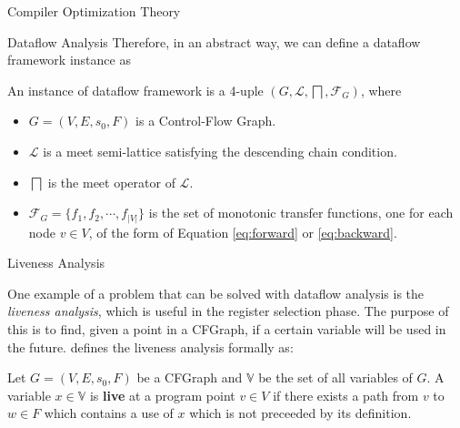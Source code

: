 \begin{section}{Compiler Optimization Theory}
\begin{subsection}{Dataflow Analysis}
	Therefore, in an abstract way, we can define a dataflow framework instance as
	\begin{definition}
		An instance of dataflow framework is a 4-uple $(G, \mathcal{L}, \bigsqcap, \mathcal{F}_G)$,
		where
		\begin{itemize}
			\item $G = (V, E, s_0, F)$ is a Control-Flow Graph.
			\item $\mathcal{L}$ is a meet semi-lattice satisfying the descending chain condition.
			\item $\bigsqcap$ is the meet operator of $\mathcal{L}$.
			\item $\mathcal{F}_G = \{f_1, f_2, \cdots, f_{|V|}\}$ is the set of monotonic transfer
			functions, one for each node $v \in V$, of the form of Equation \ref{eq:forward} or \ref{eq:backward}.
		\end{itemize}
	\end{definition}

	

	\begin{subsubsection}{Liveness Analysis}

One example of a problem that can be solved with dataflow analysis is the \textit{liveness analysis}, which is useful in the register selection phase. The purpose of this is to find, given a point in a CFGraph, if a certain variable will be used in the future. \cite{khedker2009data} defines the liveness analysis formally as:

\begin{definition}

Let $G = (V, E, s_0, F)$ be a CFGraph and $\mathbb{V}$ be the set of all
variables of $G$. A variable $x \in \mathbb{V}$ is \textbf{live} at a program
point $v \in V$ if there exists a path from $v$ to $w \in F$ which contains a
use of $x$ which is not preceeded by its definition.
\end{definition}


\end{subsubsection}
\end{subsection}
\end{section}

